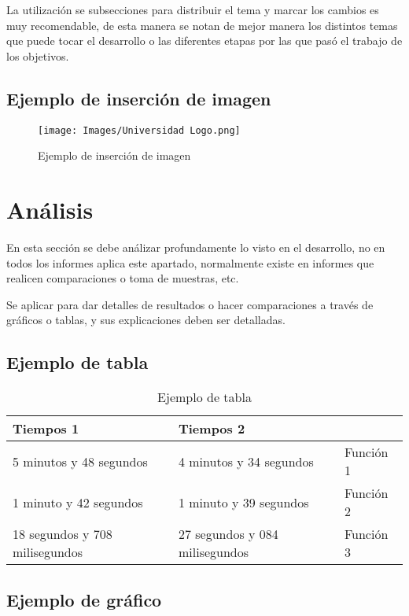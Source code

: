 \documentclass[letter,12pt]{article}
\begin{document}
La utilización se subsecciones para distribuir el tema y marcar los cambios es muy recomendable, de esta manera se notan de mejor manera los distintos temas que puede tocar el desarrollo o las diferentes etapas por las que pasó el trabajo de los objetivos.

\subsection{Ejemplo de inserción de imagen}

\begin{figure}[H]
    \centering
    \texttt{[image: Images/Universidad Logo.png]}
    \caption{Ejemplo de inserción de imagen}
\end{figure}

\newpage

\section{Análisis}

En esta sección se debe análizar profundamente lo visto en el desarrollo, no en todos los informes aplica este apartado, normalmente existe en informes que realicen comparaciones o toma de muestras, etc.

Se aplicar para dar detalles de resultados o hacer comparaciones a través de gráficos o tablas, y sus explicaciones deben ser detalladas.

\subsection{Ejemplo de tabla}

\begin{table}[H]
\centering
\begin{tabular}{|l|l|l|}
\hline
Tiempos 1 & Tiempos 2 &  \\ \hline
5 minutos y 48 segundos   & 4 minutos y 34 segundos & Función 1 \\ \hline
1 minuto y 42 segundos & 1 minuto y 39 segundos & Función 2 \\ \hline
18 segundos y 708 milisegundos & 27 segundos y 084 milisegundos & Función 3 \\ \hline
\end{tabular}
\caption{Ejemplo de tabla}
\end{table}

\subsection{Ejemplo de gráfico}
\end{document}

